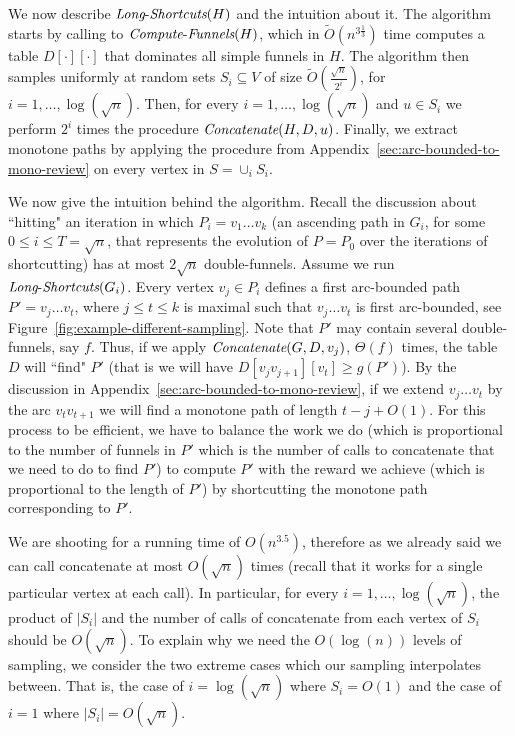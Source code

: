 \documentclass[11pt]{article}
\newcommand{\Concat}{\mbox{{\it Concatenate}}}
\newcommand{\LS}{\mbox{{\it Long}-{\it Shortcuts}}}
\newcommand{\ComputeF}{\mbox{{\it Compute}-{\it Funnels}}}
\begin{document}
We now describe $\LS(H)$ and the intuition about it.
The algorithm starts by calling to $\ComputeF(H)$, which in $\tilde{O}(n^{3\frac{1}{3}})$ time computes a table $D[\cdot][\cdot]$ that dominates all simple funnels in $H$. The algorithm then samples uniformly at random sets $S_i\subseteq V$ of size $\tilde{O}\left( \frac{\sqrt{n}}{2^i}\right)$, for $i=1,\ldots, \log (\sqrt{n})$. Then, for every $i=1,\ldots, \log (\sqrt{n})$ and $u \in S_i$ we perform $2^i$ times the procedure $\Concat(H,D,u)$. Finally, we extract monotone paths by applying the procedure from Appendix~\ref{sec:arc-bounded-to-mono-review} on every vertex in $S = \cup_i S_i$.

We now give the intuition behind the algorithm. Recall the discussion about ``hitting" an iteration in which $P_i = v_1\ldots v_k$ (an ascending path in $G_i$, for some $0\le i \le T = \sqrt{n}$, that represents the evolution of $P=P_0$ over the iterations of shortcutting) has at most $2\sqrt{n}$ double-funnels. Assume we run $\LS(G_i)$. Every vertex $v_j \in P_i$ defines a first arc-bounded path $P' = v_j \ldots v_t$, where $j\le t \le k$ is maximal such that $v_j\ldots v_t$ is first arc-bounded, see Figure~\ref{fig:example-different-sampling}.
Note that $P'$ may contain several double-funnels, say $f$. Thus, if we apply $\Concat(G,D,v_j)$, $\Theta(f)$ times, the table $D$ will ``find" $P'$ (that is we will have $D[v_{j} v_{j+1}][v_t] \ge g(P')$).
By the discussion in Appendix~\ref{sec:arc-bounded-to-mono-review}, if we extend $v_j \ldots v_t$ by the arc $v_t v_{t+1}$ we will find a monotone path of length $t-j + O(1)$. For this process to be efficient, we have to balance the work we do (which is proportional to the number of funnels in $P'$ which is the number of calls to concatenate that we need to do to find $P'$) to compute $P'$ with the reward we achieve (which is proportional to the length of $P'$) by shortcutting the monotone path corresponding to $P'$. 

We are shooting for a running time of $O(n^{3.5})$,
therefore as we already said we can call concatenate at most $O(\sqrt{n})$ times (recall that it works for a single particular vertex at each call).
In particular, for every $i=1,\ldots, \log (\sqrt{n})$,
the product of $|S_i|$ and the number of calls of concatenate from each vertex of $S_i$ should be $O(\sqrt{n})$.
To explain why we need the $O(\log(n))$ levels of sampling, we consider the two extreme cases which our sampling interpolates between.
That is, the case of
$i=\log (\sqrt{n})$
where $S_i=O(1)$ and the case of
$i=1$ where $|S_i|=O(\sqrt{n})$. 
\end{document}
